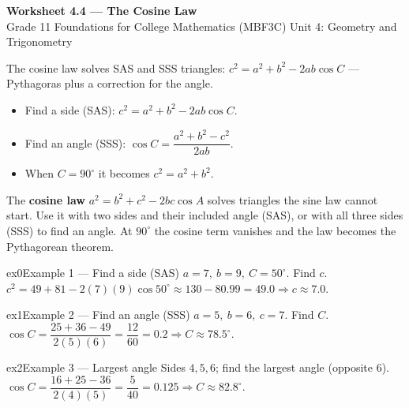 \documentclass[11pt]{article}
\begin{document}
\begin{center}
{\LARGE\bfseries\color{titleblue}Worksheet 4.4 --- The Cosine Law}\\[2pt]
{\small Grade 11 Foundations for College Mathematics (MBF3C) \textperiodcentered{} Unit 4: Geometry and Trigonometry}
\end{center}

\begin{ideabox}
The cosine law solves SAS and SSS triangles: $c^2=a^2+b^2-2ab\cos C$ — Pythagoras plus a correction for the angle.
\begin{itemize}[leftmargin=*,itemsep=2pt]
  \item Find a side (SAS): $c^2=a^2+b^2-2ab\cos C$.
  \item Find an angle (SSS): $\cos C=\dfrac{a^2+b^2-c^2}{2ab}$.
  \item When $C=90^\circ$ it becomes $c^2=a^2+b^2$.
\end{itemize}
\end{ideabox}

\begin{learnbox}
The \textbf{cosine law} $a^2=b^2+c^2-2bc\cos A$ solves triangles the sine law cannot start.
Use it with two sides and their included angle (SAS), or with all three sides (SSS) to find an angle.
At $90^\circ$ the cosine term vanishes and the law becomes the Pythagorean theorem.
\end{learnbox}


\begin{example}{ex0}{Example 1 --- Find a side (SAS)}
$a=7,\ b=9,\ C=50^\circ$. Find $c$.\soln $c^2=49+81-2(7)(9)\cos50^\circ\approx130-80.99=49.0\Rightarrow c\approx7.0$.
\end{example}

\begin{example}{ex1}{Example 2 --- Find an angle (SSS)}
$a=5,\ b=6,\ c=7$. Find $C$.\soln $\cos C=\dfrac{25+36-49}{2(5)(6)}=\dfrac{12}{60}=0.2\Rightarrow C\approx78.5^\circ$.
\end{example}

\begin{example}{ex2}{Example 3 --- Largest angle}
Sides $4,5,6$; find the largest angle (opposite $6$).\soln $\cos C=\dfrac{16+25-36}{2(4)(5)}=\dfrac{5}{40}=0.125\Rightarrow C\approx82.8^\circ$.
\end{example}
\end{document}
